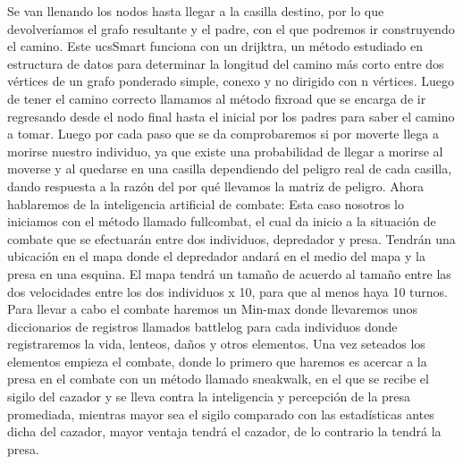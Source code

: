 \documentclass{llncs}
\begin{document}
Se van llenando los nodos hasta llegar a la casilla destino, por lo que devolveríamos el grafo resultante y el padre, con el que podremos ir construyendo el camino.
\newline
\newline
Este ucsSmart funciona con un drijktra, un método estudiado en estructura de datos para determinar la longitud del camino más corto entre dos vértices de un grafo ponderado simple, conexo y no dirigido con n vértices.
\newline
\newline
Luego de tener el camino correcto llamamos al método fixroad que se encarga de ir regresando desde el nodo final hasta el inicial por los padres para saber el camino a tomar.
\newline
\newline
Luego por cada paso que se da comprobaremos si por moverte llega a morirse nuestro individuo, ya que existe una probabilidad de llegar a morirse al moverse y al quedarse en una casilla dependiendo del peligro real de cada casilla, dando respuesta a la razón del por qué llevamos la matriz de peligro. 
\newline
\newline
Ahora hablaremos de la inteligencia artificial de combate:
\newline
\newline
Esta caso nosotros lo iniciamos con el método llamado fullcombat, el cual da inicio a la situación de combate que se efectuarán entre dos individuos, depredador y presa. Tendrán una ubicación en el mapa donde el depredador andará en el medio del mapa y la presa en una esquina. El mapa tendrá un tamaño de acuerdo al tamaño entre las dos velocidades entre los dos individuos x 10, para que al menos haya 10 turnos.
\newline
\newline
Para llevar a cabo el combate haremos un Min-max donde llevaremos unos diccionarios de registros llamados battlelog para cada individuos donde registraremos la vida, lenteos, daños y otros elementos.
\newline
\newline
Una vez seteados los elementos empieza el combate, donde lo primero que haremos es acercar a la presa en el combate con un método llamado sneakwalk, en el que se recibe el sigilo del cazador y se lleva contra la inteligencia y percepción de la presa promediada, mientras mayor sea el sigilo comparado con las estadísticas antes dicha del cazador, mayor ventaja tendrá el cazador, de lo contrario la tendrá la presa.
\end{document}
